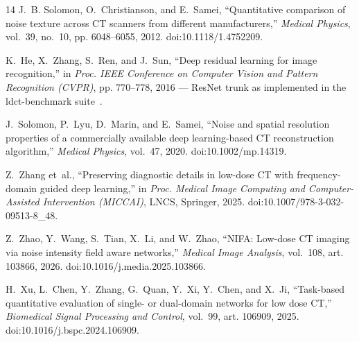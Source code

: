 \begin{thebibliography}{14}
J.~B. Solomon, O.~Christianson, and E.~Samei,
``Quantitative comparison of noise texture across CT scanners from different manufacturers,''
\emph{Medical Physics}, vol.~39, no.~10, pp. 6048--6055, 2012.
doi:10.1118/1.4752209.

K.~He, X.~Zhang, S.~Ren, and J.~Sun,
``Deep residual learning for image recognition,''
in \emph{Proc. IEEE Conference on Computer Vision and Pattern Recognition (CVPR)}, pp. 770--778, 2016
--- ResNet trunk as implemented in the ldct-benchmark suite~\cite{eulig2024}.

J.~Solomon, P.~Lyu, D.~Marin, and E.~Samei,
``Noise and spatial resolution properties of a commercially available deep learning-based CT reconstruction algorithm,''
\emph{Medical Physics}, vol.~47, 2020.
doi:10.1002/mp.14319.

Z.~Zhang et~al.,
``Preserving diagnostic details in low-dose CT with frequency-domain guided deep learning,''
in \emph{Proc. Medical Image Computing and Computer-Assisted Intervention (MICCAI)}, LNCS, Springer, 2025.
doi:10.1007/978-3-032-09513-8\_48.

Z.~Zhao, Y.~Wang, S.~Tian, X.~Li, and W.~Zhao,
``NIFA: Low-dose CT imaging via noise intensity field aware networks,''
\emph{Medical Image Analysis}, vol.~108, art. 103866, 2026.
doi:10.1016/j.media.2025.103866.

H.~Xu, L.~Chen, Y.~Zhang, G.~Quan, Y.~Xi, Y.~Chen, and X.~Ji,
``Task-based quantitative evaluation of single- or dual-domain networks for low dose CT,''
\emph{Biomedical Signal Processing and Control}, vol.~99, art. 106909, 2025.
doi:10.1016/j.bspc.2024.106909.

\end{thebibliography}
